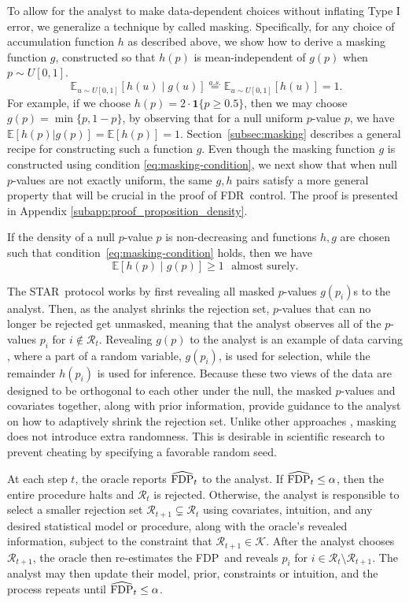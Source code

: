 \documentclass{biometrika}
\newcommand{\cR}{\mathcal{R}}
\newcommand{\cK}{\mathcal{K}}
\newcommand{\textFDP}{FDP}
\newcommand{\textFDR}{FDR}
\renewcommand{\star}{STAR}
\newcommand{\hFDP}{\widehat{\textnormal{FDP}}}
\newcommand{\E}{\mathbb{E}}
\newcommand{\1}{\mathbf{1}}
\newcommand{\eqAS}{\overset{a.s.}{=}}
\begin{document}
To allow for the analyst to make data-dependent choices without inflating Type I error, we generalize a technique by \citet{lei2018adapt} called masking. Specifically, for any choice of accumulation function $h$ as described above, we show how to derive a masking function $g$, constructed so that $h(p)$ is mean-independent of $g(p)$ when $p \sim U[0,1]$. \begin{equation}~\label{eq:masking-condition}
\E_{u \sim U[0,1]}[h(u) \mid g(u)] \eqAS \E_{u \sim U[0,1]}[h(u)] = 1.
\end{equation}
For example, if we choose $h(p) = 2\cdot \1\{p \geq 0.5\}$, then we may choose $g(p) = \min\{p,1-p\}$, by observing that for a null uniform $p$-value $p$, we have $\E[h(p)|g(p)]=\E[h(p)]=1$. Section~\ref{subsec:masking} describes a general recipe for constructing such a function $g$. Even though the masking function $g$ is constructed using condition \eqref{eq:masking-condition}, we next show that when null $p$-values are not exactly uniform, the same $g,h$ pairs satisfy a more general property that will be crucial in the proof of \textFDR ~control. The proof is presented in Appendix \ref{subapp:proof_proposition_density}.
\begin{proposition}\label{prop:density}
If the density of a null $p$-value $p$ is non-decreasing and functions $h,g$ are chosen such that condition~\eqref{eq:masking-condition} holds, then we have
\[\E[h(p) \mid g(p)] \geq 1 \,\,\mbox{ almost surely}.\]
\end{proposition}

The \star ~protocol works by first revealing all masked $p$-values $g(p_i)$s to the analyst. Then, as the analyst shrinks the rejection set, 
$p$-values that can no longer be rejected get unmasked, meaning that the analyst observes all of the $p$-values $p_i$ for $i \notin \cR_t$. Revealing $g(p)$ to the analyst is an example of data carving \citep{fithian2014optimal}, where a part of a random variable, $g(p_i)$, is used for selection, while the remainder $h(p_i)$ is used for inference. Because these two views of the data are designed to be orthogonal to each other under the null, the masked $p$-values and covariates together, along with prior information, provide guidance to the analyst on how to adaptively shrink the rejection set. Unlike other approaches \citep[e.g.][]{dwork2015reusable}, masking does not introduce extra randomness. This is desirable in scientific research to prevent cheating by specifying a favorable random seed.

At each step $t$, the oracle reports $\hFDP_t$ to the analyst. If $\hFDP_t \leq \alpha$, then the entire procedure halts and $\cR_t$ is rejected. Otherwise, the analyst is responsible to select a smaller rejection set $\cR_{t+1} \subsetneq \cR_t$ using covariates, intuition, and any desired statistical model or procedure, along with the oracle's revealed information, subject to the constraint that $\cR_{t+1} \in \cK$. After the analyst chooses $\cR_{t+1}$, the oracle then re-estimates the \textFDP ~and reveals $p_i$ for $i\in \cR_{t}\setminus \cR_{t+1}$. The analyst may then update their model, prior, constraints or intuition, and the process repeats until $\hFDP_t\le \alpha$.
\end{document}
